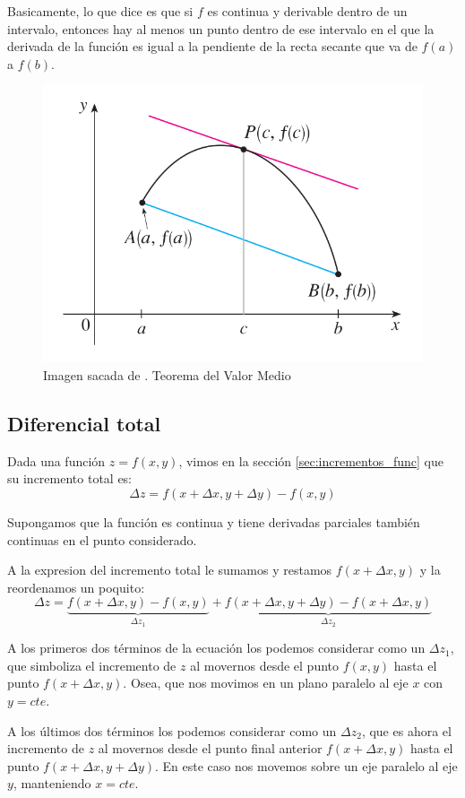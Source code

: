 \documentclass[12pt]{article}
\begin{document}
Basicamente, lo que dice es que si $ f $ es continua y derivable dentro de un intervalo, entonces hay al menos un punto dentro de ese intervalo en el que la derivada de la función es igual a la pendiente de la recta secante que va de $ f(a) $ a $ f(b) $.

\begin{figure}[H]
  \centering
  \includegraphics[width=0.5\linewidth]{imagenes/valor_medio.png}
  \caption{Imagen sacada de \parencite{stewart2}. Teorema del Valor Medio}
  \label{fig:valor_medio}
\end{figure}



\subsection{Diferencial total}
Dada una función $ z = f(x,y) $, vimos en la sección \ref{sec:incrementos_func} que su incremento total es:
\[
\Delta z = f(x + \Delta x, y + \Delta y) - f(x,y)
\]

Supongamos que la función es continua y tiene derivadas parciales también continuas en el punto considerado.

A la expresion del incremento total le sumamos y restamos $ f(x + \Delta x,y) $ y la reordenamos un poquito:
\[
\Delta z = \underbrace{f(x + \Delta x, y) - f(x,y)}_{\Delta z_{1}} + \underbrace{f(x + \Delta x, y + \Delta y) - f(x + \Delta x, y)}_{\Delta z_{2}}
\]

A los primeros dos términos de la ecuación los podemos considerar como un $ \Delta z_{1} $, que simboliza el incremento de $ z $ al movernos desde el punto $ f(x,y) $ hasta el punto $ f(x + \Delta x, y) $. Osea, que nos movimos en un plano paralelo al eje $ x $ con $ y = cte $.

A los últimos dos términos los podemos considerar como un $ \Delta z_{2} $, que es ahora el incremento de $ z $ al movernos desde el punto final anterior $ f(x + \Delta x, y) $ hasta el punto $ f(x + \Delta x, y + \Delta y) $. En este caso nos movemos sobre un eje paralelo al eje $ y $, manteniendo $ x = cte $.
\end{document}
